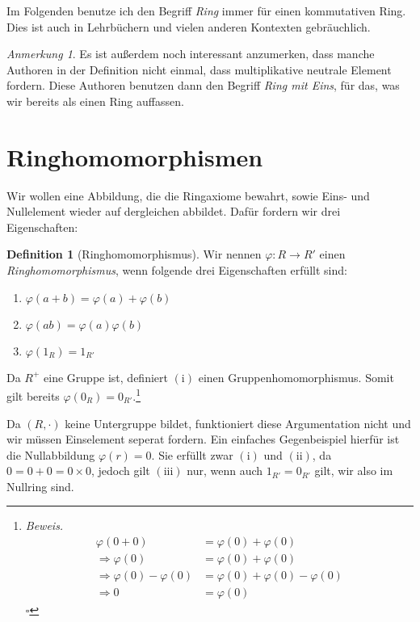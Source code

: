 \documentclass{article}
\theoremstyle{definition}
\newtheorem*{definition}{Definition}
\theoremstyle{remark}
\newtheorem*{anm}{Anmerkung}
\begin{document}
Im Folgenden benutze ich den Begriff \emph{Ring} immer für einen kommutativen Ring.
Dies ist auch in Lehrbüchern und vielen anderen Kontexten gebräuchlich.

\begin{anm} Es ist außerdem noch interessant anzumerken, dass manche Authoren in der Definition nicht einmal,
dass multiplikative neutrale Element fordern. Diese Authoren benutzen dann den Begriff \emph{Ring mit Eins},
für das, was wir bereits als einen Ring auffassen.
\end{anm}

\newpage
\section{Ringhomomorphismen}

Wir wollen eine Abbildung, die die Ringaxiome bewahrt, sowie Eins- und Nullelement wieder auf dergleichen
abbildet. Dafür fordern wir drei Eigenschaften:

\begin{definition}[Ringhomomorphismus] Wir nennen $\varphi: R\to R'$ einen \emph{Ringhomomorphismus}, wenn
folgende drei Eigenschaften erfüllt sind: \begin{enumerate}[label=(\roman*)]
    \item $\varphi(a+b) = \varphi(a) + \varphi(b)$
    \item $\varphi(a b) = \varphi(a)   \varphi(b)$
    \item $\varphi(1_R) = 1_{R'}$
\end{enumerate}
\end{definition}

Da $R^+$ eine Gruppe ist, definiert $(\mathrm i)$ einen Gruppenhomomorphismus. Somit gilt bereits
$\varphi(0_R)=0_{R'}$.\footnote{\textit{Beweis.}
\begin{align*}
\varphi(0+0) &= \varphi(0)+\varphi(0) \\
\Rightarrow \varphi(0) &= \varphi(0)+\varphi(0) \\
\Rightarrow \varphi(0)-\varphi(0) &= \varphi(0)+\varphi(0)-\varphi(0) \\
\Rightarrow 0 &= \varphi(0)
\end{align*}
\hfill$\square$}

\vspace{0.7em}
Da $(R,\cdot)$ keine Untergruppe bildet, funktioniert diese Argumentation nicht und wir müssen Einselement
seperat fordern. Ein einfaches Gegenbeispiel hierfür ist die Nullabbildung $\varphi(r)=0$. Sie erfüllt zwar
$(\mathrm{i})$ und $(\mathrm{ii})$, da $0=0+0=0\times0$, jedoch gilt $(\mathrm{iii})$ nur, wenn auch
$1_{R'}=0_{R'}$ gilt, wir also im Nullring sind. 
\end{document}
